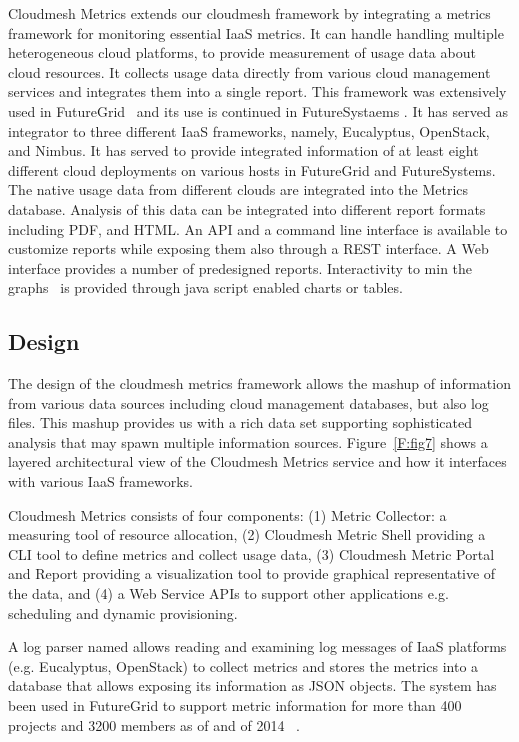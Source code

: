\documentclass{sig-alternate-05-2015}
\begin{document}
Cloudmesh Metrics extends our cloudmesh framework \cite{??} by
integrating a metrics framework for monitoring essential IaaS
metrics. It can handle handling multiple heterogeneous cloud
platforms, to provide measurement of usage data about cloud resources.
It collects usage data directly from various cloud management services
and integrates them into a single report. This framework was
extensively used in FutureGrid~\cite{las2010gce,las12fg-bookchapter} and its use
is continued in FutureSystaems \cite{??}. It has served as integrator
to three different IaaS frameworks, namely, Eucalyptus, OpenStack, and
Nimbus. It has served to provide integrated information of at least
eight different cloud deployments on various hosts in FutureGrid and
FutureSystems.  The native usage data from different clouds are
integrated into the Metrics database. Analysis of this data can be
integrated into different report formats including PDF, and HTML. An
API and a command line interface is available to customize reports
while exposing them also through a REST interface. A Web interface
provides a number of predesigned reports. Interactivity to min the
graphs~\cite{highsoft2012highcharts} is provided through java script
enabled charts or tables.

\subsection{Design}

The design of the cloudmesh metrics framework allows the mashup of
information from various data sources including cloud management
databases, but also log files. This mashup provides us with a rich
data set supporting sophisticated analysis that may spawn multiple
information sources. Figure~\ref{F:fig7} shows a layered architectural
view of the Cloudmesh Metrics service and how it interfaces with
various IaaS frameworks.

Cloudmesh Metrics consists of four components: (1) Metric Collector: a
measuring tool of resource allocation, (2) Cloudmesh Metric Shell providing a CLI tool to
define metrics and collect usage data, (3) Cloudmesh Metric Portal and Report
providing a visualization tool to provide graphical representative of
the data, and (4) a Web Service APIs to support other applications
e.g. scheduling and dynamic provisioning.

A log parser named allows reading and examining log messages of IaaS
platforms (e.g. Eucalyptus, OpenStack) to collect metrics and stores
the metrics into a database that allows exposing its information as
JSON objects. The system has been used in FutureGrid to support metric
information for more than 400 projects and 3200 members as of and of 2014
~\cite{las14cloudmeshmultiple}.
\end{document}
